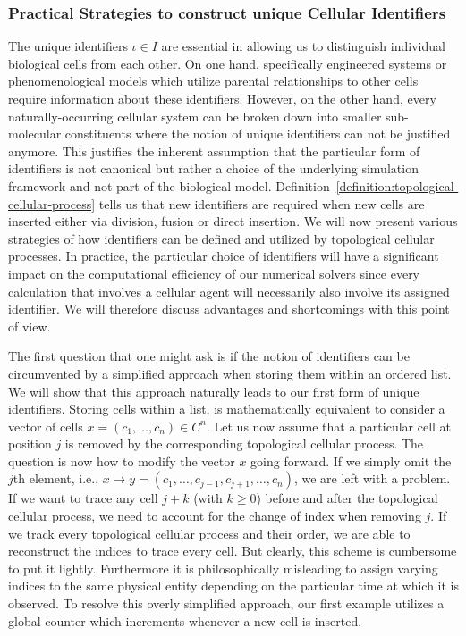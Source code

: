 \subsubsection{Practical Strategies to construct unique Cellular Identifiers}
\label{subsubsection:practical-identifiers}
The unique identifiers $\iota\in I$ are essential in allowing us to distinguish individual
biological cells from each other.
On one hand, specifically engineered systems or phenomenological models which utilize parental
relationships to other cells require information about these identifiers.
However, on the other hand, every naturally-occurring cellular system can be broken down into smaller
sub-molecular constituents where the notion of unique identifiers can not be justified anymore.
This justifies the inherent assumption that the particular form of identifiers is not canonical but
rather a choice of the underlying simulation framework and not part of the biological model.
Definition~\ref{definition:topological-cellular-process} tells us that new identifiers are required
when new cells are inserted either via division, fusion or direct insertion.
We will now present various strategies of how identifiers can be defined and utilized by
topological cellular processes.
In practice, the particular choice of identifiers will have a significant impact on the
computational efficiency of our numerical solvers since every calculation that involves a cellular
agent will necessarily also involve its assigned identifier.
We will therefore discuss advantages and shortcomings with this point of view.

The first question that one might ask is if the notion of identifiers can be circumvented by a
simplified approach when storing them within an ordered list.
We will show that this approach naturally leads to our first form of unique identifiers.
Storing cells within a list, is mathematically equivalent to consider a vector of cells
$x=(c_1,\dots,c_n)\in C^n$.
Let us now assume that a particular cell at position $j$ is removed by the corresponding topological
cellular process.
The question is now how to modify the vector $x$ going forward.
If we simply omit the $j$th element, i.e., $x\mapsto y=(c_1,\dots,c_{j-1},c_{j+1},\dots,c_n)$, we are
left with a problem.
If we want to trace any cell $j+k$ (with $k\geq0$) before and after the topological cellular
process, we need to account for the change of index when removing $j$.
If we track every topological cellular process and their order, we are able to reconstruct the
indices to trace every cell.
But clearly, this scheme is cumbersome to put it lightly.
Furthermore it is philosophically misleading to assign varying indices to the same physical entity
depending on the particular time at which it is observed.
To resolve this overly simplified approach, our first example utilizes a global counter which
increments whenever a new cell is inserted.

